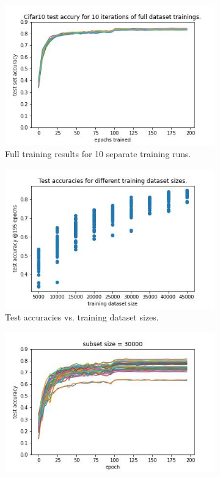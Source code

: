 \documentclass{article} %
\begin{document}
\begin{figure}
    \begin{subfigure}{.3\textwidth}
        \centering
        \includegraphics[width=.8\linewidth]{cifar10/Cifar10_full_dataset_acc_vs_epoch.jpg}
        \caption{Full training results for 10 separate training runs.}
        \label{fig_full_dataset_epoch_vs_acc_cifar}
    \end{subfigure}%
    \begin{subfigure}{.3\textwidth}
        \centering
        \includegraphics[width=.8\linewidth]{cifar10/Cifar10_training_datasetsize_vs_test_acc.jpg}
        \caption{Test accuracies vs. training dataset sizes.}
        \label{fig_traing_subset_size_vs_test_acc_cifar}
    \end{subfigure}
    \begin{subfigure}{.3\textwidth}
        \centering
        \includegraphics[width=.8\linewidth]{cifar10/test_acc_vs_epoch_subset_size_30000.jpg}

\end{subfigure}
\end{figure}
\end{document}
